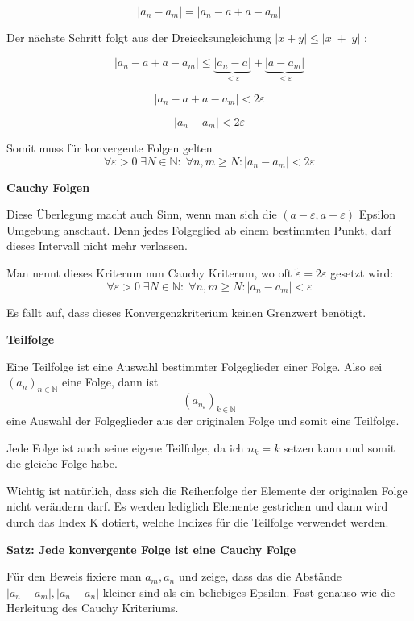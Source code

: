 \documentclass[smallheadings,headsepline,12pt,a4paper]{scrartcl}
\begin{document}
$$|a_n-a_m| = |a_n-a + a-a_m|$$

Der nächste Schritt folgt aus der Dreiecksungleichung $ |x+y| \leq |x| + |y| $ : 

$$ |a_n-a + a-a_m| \leq \underbrace{|a_n-a|}_{<\varepsilon} + \underbrace{|a-a_m|}_{<\varepsilon} $$

$$ |a_n-a + a-a_m| < 2\varepsilon $$

$$ |a_n-a_m| < 2\varepsilon $$

\item Somit muss für konvergente Folgen gelten 
$$ \forall \varepsilon > 0 \; \exists N \in \mathbb{N} : \; \forall n,m \geq N : |a_n-a_m| < 2\varepsilon $$

\newpage
\begin{center}
\item[\textbf{Cauchy Folgen}]
\end{center}
\item Diese Überlegung macht auch Sinn, wenn man sich die ${\displaystyle (a-\varepsilon ,a+\varepsilon )} $ Epsilon Umgebung anschaut. Denn jedes Folgeglied ab einem bestimmten Punkt, darf dieses Intervall nicht mehr verlassen. \\
\item Man nennt dieses Kriterum nun Cauchy Kriterum, wo oft $ \tilde{\varepsilon} = 2\varepsilon$ gesetzt wird:
$$ \forall \varepsilon > 0 \; \exists N \in \mathbb{N} : \; \forall n,m \geq N : |a_n-a_m| < \varepsilon $$

Es fällt auf, dass dieses Konvergenzkriterium keinen Grenzwert benötigt.

\begin{center}
\item[\textbf{Teilfolge}]
\end{center}
\item Eine Teilfolge ist eine Auswahl bestimmter Folgeglieder einer Folge. Also sei $ (a_n)_{n \in \mathbb{N}} $ eine Folge, dann ist 
$$  (a_{n_\varepsilon})_{k \in \mathbb{N}} $$ eine Auswahl der Folgeglieder aus der originalen Folge und somit eine Teilfolge.
\item Jede Folge ist auch seine eigene Teilfolge, da ich $n_k =k$ setzen kann und somit die gleiche Folge habe.
\item Wichtig ist natürlich, dass sich die Reihenfolge der Elemente der originalen Folge nicht verändern darf. Es werden lediglich Elemente gestrichen und dann wird durch das Index K dotiert, welche Indizes für die Teilfolge verwendet werden.


\begin{center}
\item[\textbf{Satz: Jede konvergente Folge ist eine Cauchy Folge}]
\end{center}
\item Für den Beweis fixiere man $a_m,a_n$ und zeige, dass das die Abstände $|a_n-a_m|,|a_n-a_n|$ kleiner sind als ein beliebiges Epsilon. Fast genauso 
wie die Herleitung des Cauchy Kriteriums.
\end{document}
